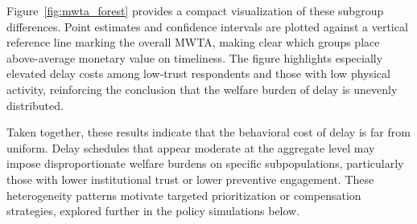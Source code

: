 \documentclass[doublespacing]{utdthesis}
\begin{document}
Figure~\ref{fig:mwta_forest} provides a compact visualization of these subgroup differences. Point estimates and confidence intervals are plotted against a vertical reference line marking the overall MWTA, making clear which groups place above-average monetary value on timeliness. The figure highlights especially elevated delay costs among low-trust respondents and those with low physical activity, reinforcing the conclusion that the welfare burden of delay is unevenly distributed.

Taken together, these results indicate that the behavioral cost of delay is far from uniform. Delay schedules that appear moderate at the aggregate level may impose disproportionate welfare burdens on specific subpopulations, particularly those with lower institutional trust or lower preventive engagement. These heterogeneity patterns motivate targeted prioritization or compensation strategies, explored further in the policy simulations below.
\end{document}
